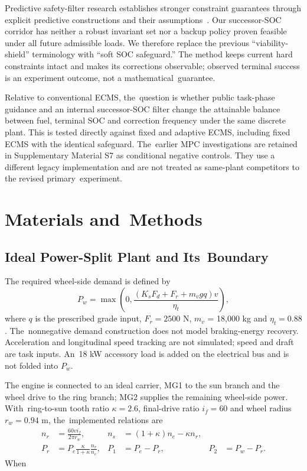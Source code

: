 \documentclass[energies,article,submit,moreauthors]{Definitions/mdpi}
\begin{document}
Predictive safety-filter research establishes stronger constraint guarantees through explicit predictive constructions and their assumptions~\cite{wabersich2021}. Our successor-SOC corridor has neither a robust invariant set nor a backup policy proven feasible under all future admissible loads. We therefore replace the previous ``viability-shield'' terminology with ``soft SOC safeguard.'' The method keeps current hard constraints intact and makes its corrections observable; observed terminal success is an experiment outcome, not a mathematical~guarantee.

Relative to conventional ECMS, the~question is whether public task-phase guidance and an internal successor-SOC filter change the attainable balance between fuel, terminal SOC and correction frequency under the same discrete plant. This is tested directly against fixed and adaptive ECMS, including fixed ECMS with the identical safeguard. The~earlier MPC investigations are retained in Supplementary Material S7 as conditional negative controls. They use a different legacy implementation and are not treated as same-plant competitors to the revised primary~experiment.

\section{Materials and~Methods}
\unskip
\subsection{Ideal Power-Split Plant and Its~Boundary}
The required wheel-side demand is defined by
\begin{equation}\label{eq:demand}
 P_w=\max\!\left(0,\frac{(K_sF_d+F_r+m_vgq)v}{\eta_t}\right),
\end{equation}
where $q$ is the prescribed grade input, $F_r=2500$ N, $m_v$ = 18,000 kg and $\eta_t=0.88$. The~nonnegative demand construction does not model braking-energy recovery. Acceleration and longitudinal speed tracking are not simulated; speed and draft are task inputs. An~18 kW accessory load is added on the electrical bus and is not folded into $P_w$.

The engine is connected to an ideal carrier, MG1 to the sun branch and the wheel drive to the ring branch; MG2 supplies the remaining wheel-side power. With~ring-to-sun tooth ratio $\kappa=2.6$, final-drive ratio $i_f=60$ and wheel radius $r_w=0.94$ m, the~implemented relations are
\begin{align}
 n_r&=\frac{60v i_f}{2\pi r_w},&
 n_s&=(1+\kappa)n_e-\kappa n_r,\label{eq:kinematics}\\
 P_r&=P_e\frac{\kappa}{1+\kappa}\frac{n_r}{n_e},&
 P_1&=P_e-P_r,& P_2&=P_w-P_r.\label{eq:split}
\end{align}
When
\end{document}

